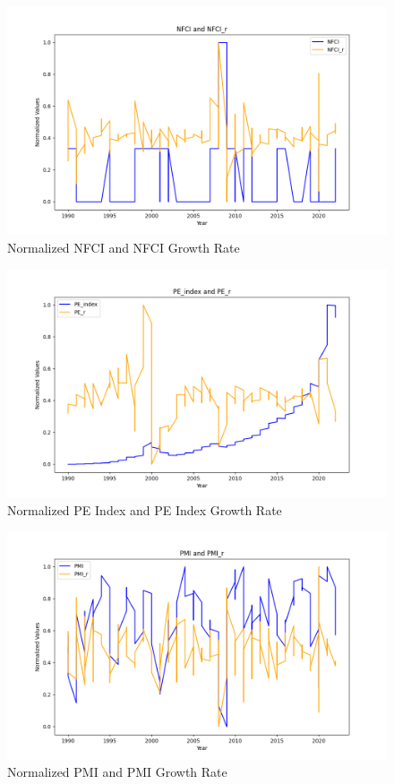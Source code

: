 \documentclass[12pt]{article}
\begin{document}
\begin{figure}[H]
    \centering
    \includegraphics[width=0.75\linewidth]{NFCI_NFCI_r.png}
    \caption{Normalized NFCI and NFCI Growth Rate}
    \label{fig:enter-label}
\end{figure}
\begin{figure}[H]
    \centering
    \includegraphics[width=0.75\linewidth]{PE_index_PE_r.png}
    \caption{Normalized PE Index and PE Index Growth Rate}
    \label{fig:enter-label}
\end{figure}
\begin{figure}[H]
    \centering
    \includegraphics[width=0.75\linewidth]{PMI_PMI_r.png}
    \caption{Normalized PMI and PMI Growth Rate}
    \label{fig:enter-label}
\end{figure}
\end{document}
